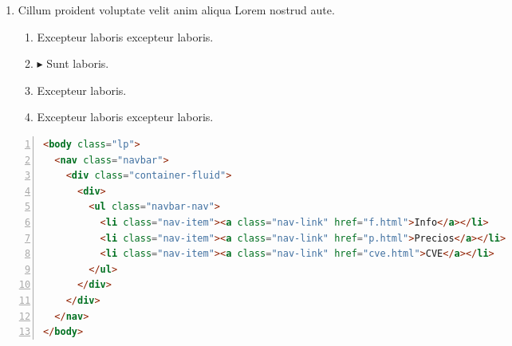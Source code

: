 \documentclass[a4paper,12pt]{article}
\begin{document}
\begin{enumerate}[label=\textbf{\arabic*.}]
\begin{multicols}{2}
\begin{enumerate}
		\item $\blacktriangleright$  Sunt laboris.
    
		\item  Excepteur laboris excepteur laboris.
  
		\item  Excepteur laboris.
    
	\end{enumerate}

\end{multicols}
\item Cillum proident voluptate velit anim aliqua Lorem nostrud aute.
\begin{multicols}{2}
	\begin{enumerate}
		\item  Excepteur laboris excepteur laboris.
  
		\item $\blacktriangleright$  Sunt laboris.
    
		\item  Excepteur laboris.
    
		\item  Excepteur laboris excepteur laboris.
    
	\end{enumerate}

\end{multicols}
\end{enumerate}

\newpage
\begin{lstlisting}[language=HTML, caption={Documento en HTML}, label={lst:1}, numbers=left]
<body class="lp">
  <nav class="navbar">
    <div class="container-fluid">
      <div>
        <ul class="navbar-nav">
          <li class="nav-item"><a class="nav-link" href="f.html">Info</a></li>
          <li class="nav-item"><a class="nav-link" href="p.html">Precios</a></li>
          <li class="nav-item"><a class="nav-link" href="cve.html">CVE</a></li>
        </ul>
      </div>
    </div>
  </nav>
</body>
\end{lstlisting}
\end{document}
